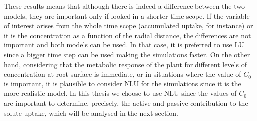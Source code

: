 




These results means that although there is indeed a difference between the two models, they are important only if looked in a shorter time scope. 
If the variable of interest arises from the whole time scope (accumulated uptake, for instance) or it is the concentration as a function of the radial distance, the differences are not important and both models can be used. 
In that case, it is preferred to use LU since a bigger time step can be used making the simulations faster.
On the other hand, considering that the metabolic response of the plant for different levels of concentration at root surface is immediate, or in situations where the value of $C_0$ is important, it is plausible to consider NLU for the simulations since it is the more realistic model.  
In this thesis we choose to use NLU since the values of $C_0$ are important to determine, precisely, the active and passive contribution to the solute uptake, which will be analysed in the next section.

